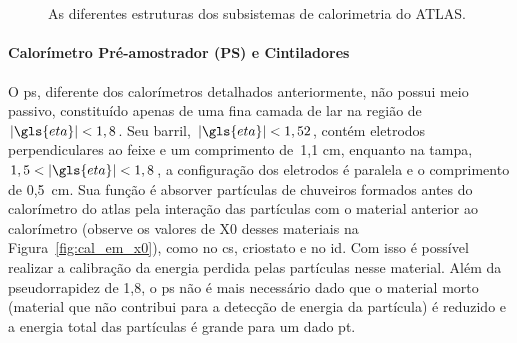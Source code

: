 \begin{figure}[ht!]
\begin{center}
{        } \\
        \hspace{0.01\textwidth}
         \\
%
    \end{center}
    \caption[As diferentes estruturas dos subsistemas de calorimetria do ATLAS]{%
As diferentes estruturas dos subsistemas de calorimetria do ATLAS.
     }%
\end{figure}


\paragraph{Calorímetro Pré-amostrador (PS) e Cintiladores}
\label{par:cal_ps}

O \gls{ps}, diferente dos calorímetros detalhados anteriormente, não possui meio passivo, 
constituído apenas de uma fina camada de \gls{lar} na região de
$|\gls{eta}|<1,8$. Seu barril, $|\gls{eta}|<1,52$, contém eletrodos
perpendiculares ao feixe e um comprimento de~1,1 cm, enquanto na tampa,
$1,5<|\gls{eta}|<1,8$, a configuração dos eletrodos é paralela e o comprimento
de 0,5~cm. Sua função é absorver partículas de chuveiros formados antes do
calorímetro do \gls{atlas} pela interação das partículas com o material anterior
ao calorímetro (observe os valores de \gls{X0} desses materiais na Figura~\ref{fig:cal_em_x0}), 
como no \gls{cs}, criostato e no \gls{id}. Com isso é possível realizar 
a calibração da energia perdida pelas partículas nesse material.
Além da pseudorrapidez de 1,8, o \gls{ps} não é mais 
necessário dado que o material morto (material que não contribui para a detecção
de energia da partícula) é reduzido e a energia total das partículas 
é grande para um dado \gls{pt}.

